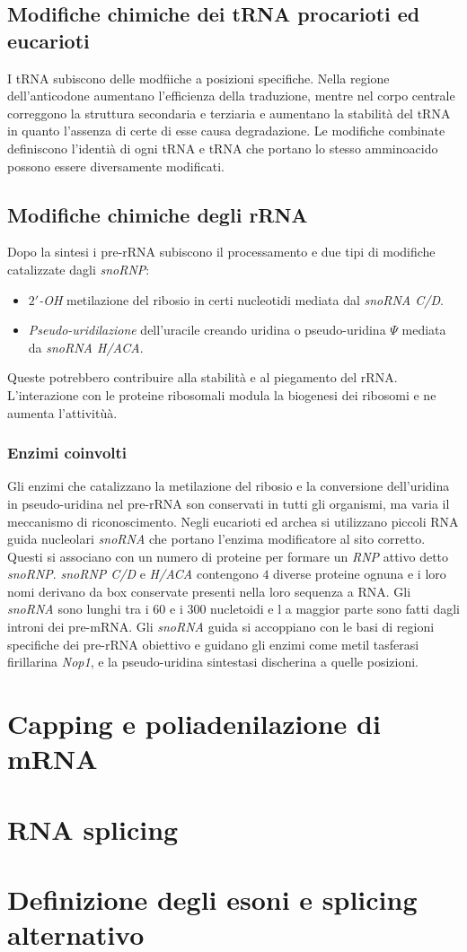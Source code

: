 \subsection{Modifiche chimiche dei tRNA procarioti ed eucarioti}
I tRNA subiscono delle modfiiche a posizioni specifiche. Nella regione dell'anticodone aumentano l'efficienza della traduzione, mentre nel corpo centrale correggono la struttura 
secondaria e terziaria e aumentano la stabilit\`a del tRNA in quanto l'assenza di certe di esse causa degradazione. Le modifiche combinate definiscono l'identi\`a di ogni tRNA e 
tRNA che portano lo stesso amminoacido possono essere diversamente modificati. 
\subsection{Modifiche chimiche degli rRNA}
Dopo la sintesi i pre-rRNA subiscono il processamento e due tipi di modifiche catalizzate dagli \emph{snoRNP}:
\begin{itemize}
	\item \emph{$2'$-OH} metilazione del ribosio in certi nucleotidi mediata dal \emph{snoRNA C/D}.
	\item \emph{Pseudo-uridilazione} dell'uracile creando uridina o pseudo-uridina $\Psi$ mediata da \emph{snoRNA H/ACA}.
\end{itemize}
Queste potrebbero contribuire alla stabilit\`a e al piegamento del rRNA. L'interazione con le proteine ribosomali  modula la biogenesi dei ribosomi e ne aumenta l'attivitù\`a. 
\subsubsection{Enzimi coinvolti}
Gli enzimi che catalizzano la metilazione del ribosio e la conversione dell'uridina in pseudo-uridina nel pre-rRNA son conservati in tutti gli organismi, ma varia il meccanismo di 
riconoscimento. Negli eucarioti ed archea si utilizzano piccoli RNA guida nucleolari \emph{snoRNA} che portano l'enzima modificatore al sito corretto. Questi si associano con un numero
di proteine per formare un \emph{RNP} attivo detto \emph{snoRNP}. \emph{snoRNP C/D} e \emph{H/ACA} contengono $4$ diverse proteine ognuna e i loro nomi derivano da box conservate 
presenti nella loro sequenza a RNA. Gli \emph{snoRNA} sono lunghi tra i $60$ e i $300$ nucletoidi e l a maggior parte sono fatti dagli introni dei pre-mRNA. Gli \emph{snoRNA} guida si 
accoppiano con le basi di regioni specifiche dei pre-rRNA obiettivo e guidano gli enzimi come metil tasferasi firillarina \emph{Nop1}, e la pseudo-uridina sintestasi discherina a quelle
posizioni. 
\section{Capping e poliadenilazione di mRNA}

\section{RNA splicing}

\section{Definizione degli esoni e splicing alternativo}


